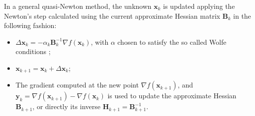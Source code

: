 In a general quasi-Newton method, the unknown \(\bm{x}_{k}\) is
updated applying the Newton's step calculated using the current
approximate Hessian matrix \(\bm{B}_{k}\) in the following fashion:
\begin{itemize}
 \item \(\Delta \bm{x}_{k} = -\alpha_{k}\bm{B}_{k}^{-1}\nabla
       f(\bm{x}_{k})\), with \(\alpha\) chosen to satisfy the so called
       Wolfe conditions \cite[p.~34]{nocedal&wright};

 \item \(\bm{x}_{k+1} = \bm{x}_{k} + \Delta\bm{x}_{k}\);

 \item The gradient computed at the new point \(\nabla
       f(\bm{x}_{k+1})\), and \(\bm{y}_{k} = \nabla f(\bm{x}_{k+1}) -
       \nabla f(\bm{x}_{k})\) is used to update the approximate Hessian
       \(\bm{B}_{k+1}\), or directly its inverse
       \(\bm{H}_{k+1} = \bm{B}_{k+1}^{-1}\).
\end{itemize}

